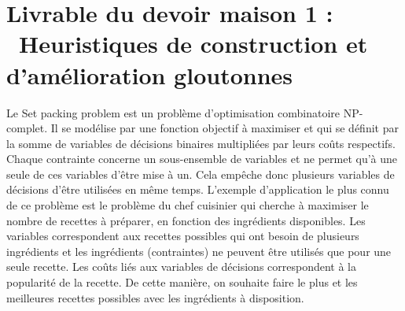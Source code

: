 

\lstset{language=julia}


\section*{Livrable du devoir maison 1 : \\ Heuristiques de construction et d'amélioration gloutonnes}

%
%

\vspace{5mm}
\noindent
{}
\vspace{2mm}


Le Set packing problem est un problème d'optimisation combinatoire NP-complet. Il
se modélise par une fonction objectif à maximiser et qui se définit par la somme de variables de décisions binaires multipliées par leurs coûts respectifs. Chaque contrainte concerne un sous-ensemble de variables et ne permet qu'à une seule de ces variables d'être mise à un. Cela empêche donc plusieurs variables de décisions d'être utilisées en même temps.
L'exemple d'application le plus connu de ce problème est le problème du chef cuisinier qui cherche à maximiser le nombre de recettes à préparer, en fonction des ingrédients disponibles. Les variables correspondent aux recettes possibles qui ont besoin
de plusieurs ingrédients et les ingrédients (contraintes) ne peuvent être utilisés
que pour une seule recette. Les coûts liés aux variables de décisions correspondent à la popularité de la recette. De cette manière, on souhaite faire le plus et les meilleures
recettes possibles avec les ingrédients à disposition.

